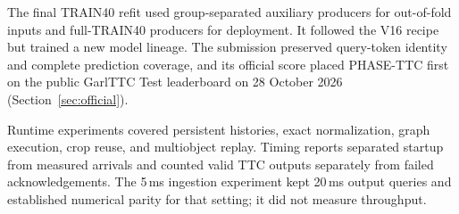 The final TRAIN40 refit used group-separated auxiliary producers for
out-of-fold inputs and full-TRAIN40 producers for deployment. It followed the
V16 recipe but trained a new model lineage. The submission preserved query-token
identity and complete prediction coverage, and its official score placed
PHASE-TTC first on the public GarlTTC Test leaderboard on 28 October 2026
(Section~\ref{sec:official}).

Runtime experiments covered persistent histories, exact normalization, graph
execution, crop reuse, and multiobject replay. Timing reports separated startup
from measured arrivals and counted valid TTC outputs separately from failed acknowledgements.
The 5\,ms ingestion experiment kept 20\,ms output queries and established
numerical parity for that setting; it did not measure throughput.

